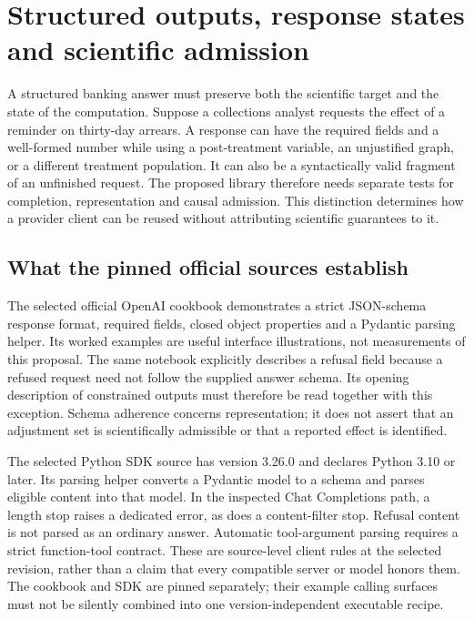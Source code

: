 \section[Structured outputs and scientific admission]{Structured outputs, response states and scientific admission}
\label{sec:exec28-oa}
A structured banking answer must preserve both the scientific target and the state of the computation.
Suppose a collections analyst requests the effect of a reminder on thirty-day arrears. A response can have
the required fields and a well-formed number while using a post-treatment variable, an unjustified graph,
or a different treatment population. It can also be a syntactically valid fragment of an unfinished request.
The proposed library therefore needs separate tests for completion, representation and causal admission.
This distinction determines how a provider client can be reused without attributing scientific guarantees to it.

\subsection{What the pinned official sources establish}
The selected official OpenAI cookbook demonstrates a strict JSON-schema response format, required fields,
closed object properties and a Pydantic parsing helper. Its worked examples are useful interface illustrations,
not measurements of this proposal. The same notebook explicitly describes a refusal field because a refused
request need not follow the supplied answer schema. Its opening description of constrained outputs must
therefore be read together with this exception. Schema adherence concerns representation; it does not assert
that an adjustment set is scientifically admissible or that a reported effect is identified.\citep{exec28_oa_cookbook}

The selected Python SDK source has version 3.26.0 and declares Python 3.10 or later. Its parsing helper converts
a Pydantic model to a schema and parses eligible content into that model. In the inspected Chat Completions path,
a length stop raises a dedicated error, as does a content-filter stop. Refusal content is not parsed as an ordinary
answer. Automatic tool-argument parsing requires a strict function-tool contract. These are source-level client
rules at the selected revision, rather than a claim that every compatible server or model honors them.
The cookbook and SDK are pinned separately; their example calling surfaces must not be silently combined into
one version-independent executable recipe.\citep{exec28_oa_sdk,exec28_oa_cookbook}

